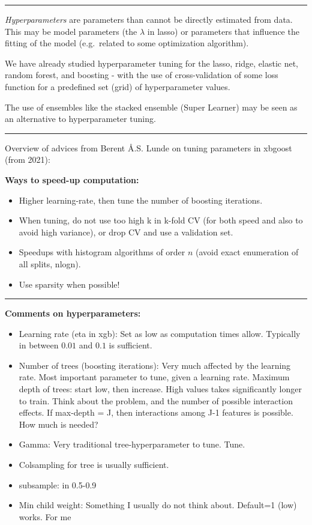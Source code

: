 \documentclass[
  letterpaper,
  DIV=11,
  numbers=noendperiod]{scrartcl}
\providecommand{\tightlist}{%
  \setlength{\itemsep}{0pt}\setlength{\parskip}{0pt}}\usepackage{longtable,booktabs,array}
\begin{document}
\begin{center}\rule{0.5\linewidth}{0.5pt}\end{center}

\emph{Hyperparameters} are parameters than cannot be directly estimated
from data. This may be model parameters (the \(\lambda\) in lasso) or
parameters that influence the fitting of the model (e.g.~related to some
optimization algorithm).

We have already studied hyperparameter tuning for the lasso, ridge,
elastic net, random forest, and boosting - with the use of
cross-validation of some loss function for a predefined set (grid) of
hyperparameter values.

The use of ensembles like the stacked ensemble (Super Learner) may be
seen as an alternative to hyperparameter tuning.

\begin{center}\rule{0.5\linewidth}{0.5pt}\end{center}

Overview of advices from Berent Å.S. Lunde on tuning parameters in
xbgoost (from 2021):

\textbf{Ways to speed-up computation:}

\begin{itemize}
\tightlist
\item
  Higher learning-rate, then tune the number of boosting iterations.
\item
  When tuning, do not use too high k in k-fold CV (for both speed and
  also to avoid high variance), or drop CV and use a validation set.
\item
  Speedups with histogram algorithms of order \(n\) (avoid exact
  enumeration of all splits, nlogn).
\item
  Use sparsity when possible!
\end{itemize}

\begin{center}\rule{0.5\linewidth}{0.5pt}\end{center}

\textbf{Comments on hyperparameters:}

\begin{itemize}
\tightlist
\item
  Learning rate (eta in xgb): Set as low as computation times allow.
  Typically in between \(0.01\) and \(0.1\) is sufficient.
\item
  Number of trees (boosting iterations): Very much affected by the
  learning rate. Most important parameter to tune, given a learning
  rate. Maximum depth of trees: start low, then increase. High values
  takes significantly longer to train. Think about the problem, and the
  number of possible interaction effects. If max-depth = J, then
  interactions among J-1 features is possible. How much is needed?
\item
  Gamma: Very traditional tree-hyperparameter to tune. Tune.
\item
  Colsampling for tree is usually sufficient.
\item
  subsample: in 0.5-0.9
\item
  Min child weight: Something I usually do not think about. Default=1
  (low) works. For me
\end{itemize}
\end{document}
